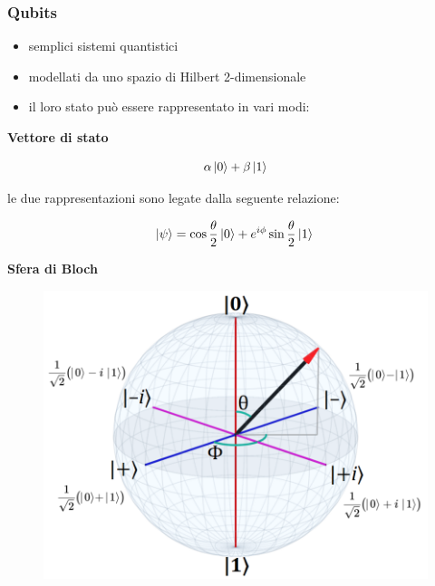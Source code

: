 \documentclass[aspectratio=169]{beamer}
\begin{document}
\begin{frame}
	\frametitle{Qubits}
	\begin{itemize}
		\item semplici sistemi quantistici
		      \pause
		\item modellati da uno spazio di Hilbert 2-dimensionale
		      \pause
		\item il loro stato può essere rappresentato in vari modi:
		      \pause
	\end{itemize}

	\vspace{10pt}

	\noindent
	\begin{minipage}{0.5\textwidth}
		\begin{center}
			\textbf{Vettore di stato}
		\end{center}
		\begin{equation*}
			\alpha \ket{0} + \beta \ket{1}
		\end{equation*}
		\vspace{10pt}

		le due rappresentazioni sono legate dalla seguente relazione:

		\begin{equation*}
			\ket{\psi} = \cos{\dfrac{\theta}{2}}\ket{0}+e^{i\phi}\sin{\dfrac{\theta}{2}}\ket{1} \\
		\end{equation*}
	\end{minipage}
	\hfill
	\begin{minipage}{0.48\textwidth}
		\begin{center}
			\textbf{Sfera di Bloch}
		\end{center}
		\begin{figure}
			\includegraphics[scale=0.3]{bloch-sphere.png}
		\end{figure}
	\end{minipage}
\end{frame}
\end{document}
